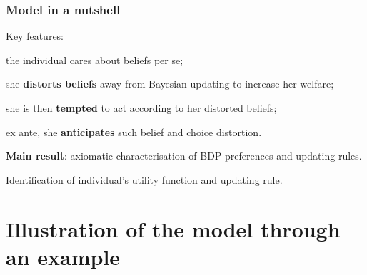 \documentclass[usenames,dvipsnames,aspectratio=169,11pt]{beamer}
\begin{document}
\begin{frame}\frametitle{Model in a nutshell}

	Key features:

	\vfill

	\begin{wideitemize}
		\item the individual cares about beliefs per se;
		\item she \textbf{distorts beliefs} away from Bayesian updating to increase her welfare;
		\item she is then \textbf{tempted} to act according to her distorted beliefs;
		\item ex ante, she \textbf{anticipates} such belief and choice distortion. \footnotesize{\citep{cobb-clarkPredictivePowerSelfcontrol2022}}
	\end{wideitemize}

	\vfill \pause

	\textbf{Main result}: axiomatic characterisation of BDP preferences and updating rules.

	\vfill

	Identification of individual's utility function and updating rule.

\end{frame}

\section{Illustration of the model through an example}
\end{document}
